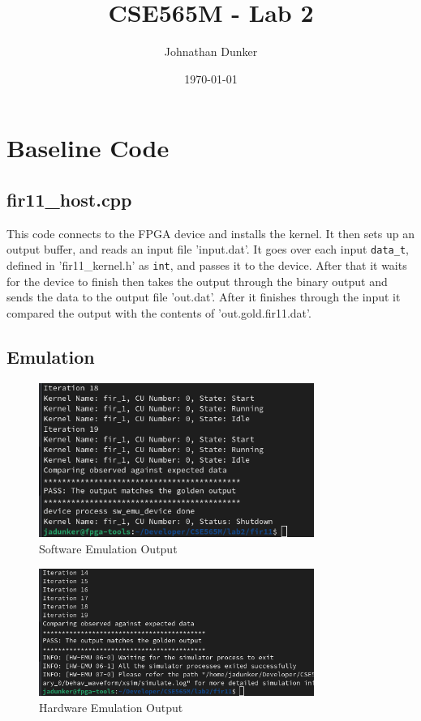 \documentclass[11pt]{article}
\title{CSE565M - Lab 2}
\author{Johnathan Dunker}
\date{\today}
\begin{document}
  \maketitle

    \section{Baseline Code}
      \subsection{fir11\_host.cpp}
      This code connects to the FPGA device and installs the kernel. It then sets up an output buffer, and reads an input file 'input.dat'. It goes over each input \texttt{data\_t}, defined in 'fir11\_kernel.h' as \texttt{int}, and passes it to the device. After that it waits for the device to finish then takes the output through the binary output and sends the data to the output file 'out.dat'. After it finishes through the input it compared the output with the contents of 'out.gold.fir11.dat'.

      \subsection{Emulation}
      \begin{figure}[h]
        \centering
        \includegraphics[width=0.8\textwidth]{baseline_sw_emu.png}
        \caption{Software Emulation Output}
        \label{fig:bl_sw_emu_out}
      \end{figure}
      \begin{figure}[h]
        \centering
        \includegraphics[width=0.8\textwidth]{baseline_hw_emu_2.png}
        \caption{Hardware Emulation Output}
        \label{fig:bl_hw_emu_out}
      \end{figure}
\end{document}

